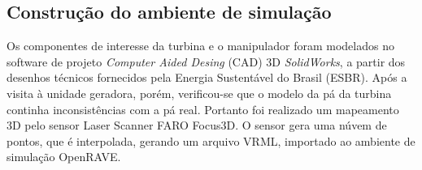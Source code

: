 \subsection{Construção do ambiente de simulação}

Os componentes de interesse da turbina e o manipulador foram modelados no
software de projeto \textit{Computer Aided Desing} (CAD) 3D \textit{SolidWorks},
a partir dos desenhos técnicos fornecidos pela Energia Sustentável do Brasil (ESBR). Após a visita à unidade geradora, porém,
verificou-se que o modelo da pá da turbina continha inconsistências com a pá
real. Portanto foi realizado um mapeamento 3D pelo sensor Laser Scanner FARO
Focus3D. O sensor gera uma núvem de pontos, que é interpolada, gerando um
arquivo VRML, importado ao ambiente de simulação OpenRAVE.
